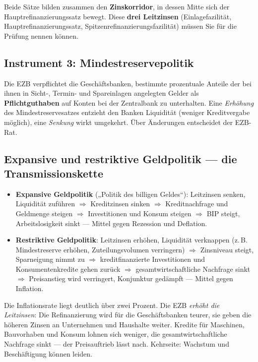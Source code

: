 \documentclass[11pt, a4paper]{article}
\begin{document}
Beide Sätze bilden zusammen den \textbf{Zinskorridor}, in dessen Mitte sich der
Hauptrefinanzierungssatz bewegt. Diese \textbf{drei Leitzinsen} (Einlagefazilität,
Hauptrefinanzierungssatz, Spitzenrefinanzierungsfazilität) müssen Sie für die Prüfung
nennen können.

\subsection{Instrument 3: Mindestreservepolitik}

Die EZB verpflichtet die Geschäftsbanken, bestimmte prozentuale Anteile der bei ihnen in
Sicht-, Termin- und Spareinlagen angelegten Gelder als \textbf{Pflichtguthaben} auf Konten
bei der Zentralbank zu unterhalten. Eine \emph{Erhöhung} des Mindestreservesatzes entzieht
den Banken Liquidität (weniger Kreditvergabe möglich), eine \emph{Senkung} wirkt umgekehrt.
Über Änderungen entscheidet der EZB-Rat.

\subsection{Expansive und restriktive Geldpolitik --- die Transmissionskette}

\begin{itemize}
  \item \textbf{Expansive Geldpolitik} („Politik des billigen Geldes``): Leitzinsen senken,
    Liquidität zuführen $\Rightarrow$ Kreditzinsen sinken $\Rightarrow$ Kreditnachfrage und
    Geldmenge steigen $\Rightarrow$ Investitionen und Konsum steigen $\Rightarrow$ BIP
    steigt, Arbeitslosigkeit sinkt --- Mittel gegen Rezession und Deflation.
  \item \textbf{Restriktive Geldpolitik}: Leitzinsen erhöhen, Liquidität verknappen
    (z.\,B. Mindestreserve erhöhen, Zuteilungsvolumen verringern) $\Rightarrow$ Zinsniveau
    steigt, Sparneigung nimmt zu $\Rightarrow$ kreditfinanzierte Investitionen und
    Konsumentenkredite gehen zurück $\Rightarrow$ gesamtwirtschaftliche Nachfrage sinkt
    $\Rightarrow$ Preisanstieg wird verringert, Konjunktur gedämpft --- Mittel gegen
    Inflation.
\end{itemize}

\begin{beispiel}
Die Inflationsrate liegt deutlich über zwei Prozent. Die EZB \emph{erhöht die Leitzinsen}:
Die Refinanzierung wird für die Geschäftsbanken teurer, sie geben die höheren Zinsen an
Unternehmen und Haushalte weiter. Kredite für Maschinen, Bauvorhaben und Konsum lohnen sich
weniger, die gesamtwirtschaftliche Nachfrage sinkt --- der Preisauftrieb lässt nach.
Kehrseite: Wachstum und Beschäftigung können leiden.
\end{beispiel}
\end{document}
